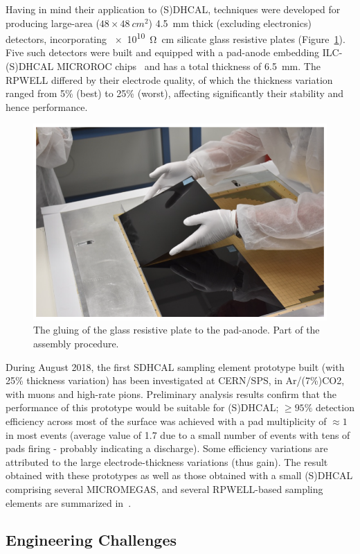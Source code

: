 Having in mind their application to (S)DHCAL, techniques were developed for producing large-area ($\SI{48} \times \SI{48}{cm^2}$) \SI{4.5}{mm} thick (excluding electronics) detectors, incorporating \SI{e10}{\ohm\centi\meter} silicate glass resistive plates (Figure~\ref{fig:Calorimeter:THGEM:glueing}). Five such detectors were built and equipped with a pad-anode embedding ILC-(S)DHCAL MICROROC chips~\cite{Adloff_2012} and has a total thickness of \SI{6.5}{mm}. The RPWELL differed by their electrode quality, of which the thickness variation ranged from 5\% (best) to 25\% (worst), affecting significantly their stability and hence performance.
\begin{figure}
	\centering
	\includegraphics[width=.5\textwidth]{Calorimeter/THGEM/resistivePlateGlueing}
	\caption{The gluing of the glass resistive plate to the pad-anode. Part of the assembly procedure.}
	\label{fig:Calorimeter:THGEM:glueing}
\end{figure}

During August 2018, the first SDHCAL sampling element prototype built (with 25\% thickness variation) has been investigated at CERN/SPS, in Ar/(7\%)CO2, with muons and high-rate pions. Preliminary analysis results confirm that the performance of this prototype would be suitable for (S)DHCAL; $\geq 95\%$ detection efficiency across most of the surface was achieved with a pad multiplicity of $\approx 1$ in most events (average value of 1.7 due to a small number of events with tens of pads firing - probably indicating a discharge). Some efficiency variations are attributed to the large electrode-thickness variations (thus gain). The result obtained with these prototypes as well as those obtained with a small (S)DHCAL comprising several MICROMEGAS, and several RPWELL-based sampling elements are summarized in~\cite{Bressler:2019uyt}.

\subsection{Engineering Challenges}

